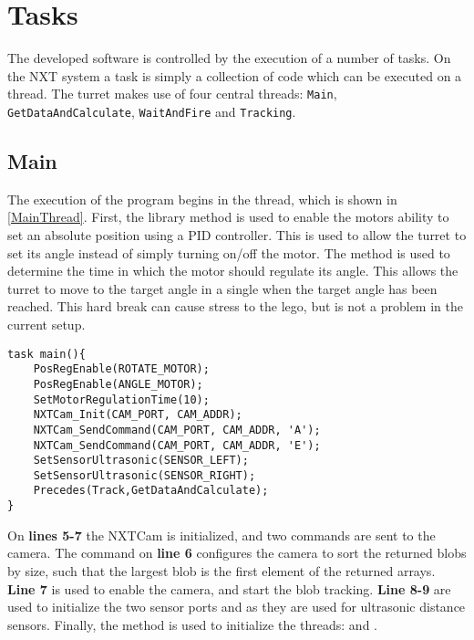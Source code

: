 \section{Tasks}
The developed software is controlled by the execution of a number of
tasks. On the NXT system a task is simply a collection of code which can be
executed on a thread. The turret makes use of four central threads:
\texttt{Main}, \texttt{GetDataAndCalculate}, \texttt{WaitAndFire} and
\texttt{Tracking}.

\subsection{Main}
The execution of the program begins in the  thread, which is shown
in \autoref{MainThread}. First, the library method
 is used to enable the motors ability to set
an absolute position using a PID controller. This is used to allow the turret to set its angle instead of simply turning on/off the motor.
The  method is used to determine the
time in which the motor should regulate its angle. This allows the
turret to move to the target angle in a single  when the target angle has been reached. This hard break can cause
stress to the lego, but is not a problem in the current setup.

\begin{minipage}[H]{\linewidth}
\begin{lstlisting}[caption = Entry point for the program execution., label = MainThread] 
task main(){
    PosRegEnable(ROTATE_MOTOR);
    PosRegEnable(ANGLE_MOTOR);
    SetMotorRegulationTime(10);
    NXTCam_Init(CAM_PORT, CAM_ADDR);
    NXTCam_SendCommand(CAM_PORT, CAM_ADDR, 'A');
    NXTCam_SendCommand(CAM_PORT, CAM_ADDR, 'E');
    SetSensorUltrasonic(SENSOR_LEFT);
    SetSensorUltrasonic(SENSOR_RIGHT);
    Precedes(Track,GetDataAndCalculate);
}
\end{lstlisting}
\end{minipage}

On \textbf{lines 5-7} the NXTCam is initialized, and two commands are
sent to the camera. The command on \textbf{line 6} configures the camera
to sort the returned blobs by size, such that the largest blob is the first
element of the returned arrays. \textbf{Line 7} is used to enable the camera,
and start the blob tracking. \textbf{Line 8-9} are used to
initialize the two sensor ports  and
 as they are used for ultrasonic distance sensors.
Finally, the  method is used to initialize the
threads:  and .
